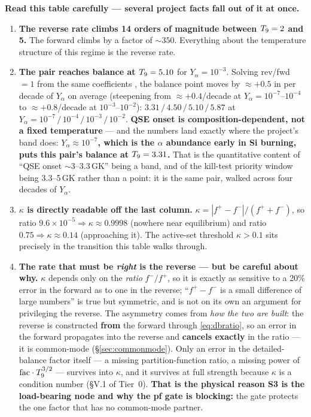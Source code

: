 \textbf{Read this table carefully --- several project facts fall out of it at
once.}

\begin{enumerate}
\item \textbf{The reverse rate climbs 14 orders of magnitude between $T_{9} = 2$
      and 5.} The forward climbs by a factor of ${\sim}350$. Everything about
      the temperature structure of this regime is the reverse rate.

\item \textbf{The pair reaches balance at $T_{9} = 5.10$} for
      $Y_\alpha = 10^{-3}$. Solving rev/fwd $= 1$ from the same coefficients
      \derivedhere{}, the balance point moves by $\approx +0.5$ in \Tn{} per
      decade of $Y_\alpha$ on average (steepening from $\approx +0.4$/decade at
      $Y_\alpha = 10^{-7}$--$10^{-4}$ to $\approx +0.8$/decade at
      $10^{-3}$--$10^{-2}$): $3.31\,/\,4.50\,/\,5.10\,/\,5.87$ at
      $Y_\alpha = 10^{-7}\,/\,10^{-4}\,/\,10^{-3}\,/\,10^{-2}$. \textbf{QSE
      onset is composition-dependent, not a fixed temperature} --- and the
      numbers land exactly where the project's band does:
      \textbf{$Y_\alpha \approx 10^{-7}$, which is the $\alpha$ abundance early
      in Si burning, puts this pair's balance at $T_{9} = 3.31$.} That is the
      quantitative content of ``QSE onset ${\sim}3$--$3.3$\,GK'' being a band,
      and of the kill-test priority window being 3.3--5\,GK rather than a point:
      it is the same pair, walked across four decades of $Y_\alpha$.

\item \textbf{$\kappa$ is directly readable off the last column.}
      $\kappa = |f^+-f^-|/(f^++f^-)$, so ratio $9.6\times10^{-5} \Rightarrow
      \kappa \approx 0.9998$ (nowhere near equilibrium) and ratio $0.75
      \Rightarrow \kappa \approx 0.14$ (approaching it). The active-set
      threshold $\kappa > 0.1$ sits precisely in the transition this table walks
      through.

\item \textbf{The rate that must be \emph{right} is the reverse --- but be
      careful about why.} $\kappa$ depends only on the \emph{ratio}
      $f^-/f^+$, so it is exactly as sensitive to a 20\% error in the forward as
      to one in the reverse; ``$f^+ - f^-$ is a small difference of large
      numbers'' is true but symmetric, and is not on its own an argument for
      privileging the reverse. The asymmetry comes from \emph{how the two are
      built}: the reverse is constructed \textbf{from} the forward through
      \eqref{eq:dbratio}, so an error in the forward propagates into the reverse
      and \textbf{cancels exactly} in the ratio --- it is common-mode
      (\S\ref{sec:commonmode}). Only an error in the detailed-balance factor
      itself --- a missing partition-function ratio, a missing power of
      $\mathrm{fac}\cdot T_{9}^{3/2}$ --- survives into $\kappa$, and it survives at full
      strength because $\kappa$ is a condition number (\S V.1 of Tier~0).
      \textbf{That is the physical reason S3 is the load-bearing node and why
      the pf gate is blocking:} the gate protects the one factor that has no
      common-mode partner.
\end{enumerate}

